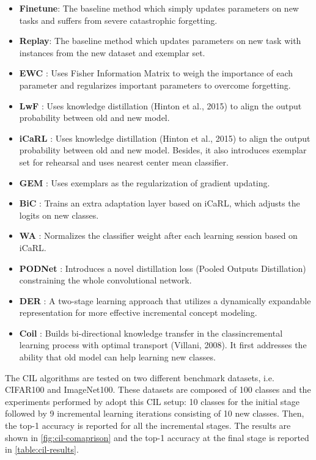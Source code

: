 \begin{itemize}
    \item \textbf{Finetune}: The baseline method which simply updates parameters on new tasks and
    suffers from severe catastrophic forgetting.
    \item \textbf{Replay}: The baseline method which updates parameters on new task with instances
    from the new dataset and exemplar set.
    \item \textbf{EWC} \cite{kirkpatrick2017overcoming}: Uses Fisher Information Matrix to weigh the
    importance of each parameter and regularizes important parameters to overcome forgetting.
    \item \textbf{LwF} \cite{li2017learning}: Uses knowledge distillation (Hinton et al., 2015) to
    align the output probability between old and new model.
    \item \textbf{iCaRL} \cite{rebuffi2017icarl}: Uses knowledge distillation (Hinton et al., 2015) to
    align the output probability between old and new model. Besides, it also introduces
    exemplar set for rehearsal and uses nearest center mean classifier.
    \item \textbf{GEM} \cite{lopez2017gradient}: Uses exemplars as the regularization of
    gradient updating.
    \item \textbf{BiC} \cite{wu2019large}: Trains an extra adaptation layer based on iCaRL, which
    adjusts the logits on new classes.
    \item \textbf{WA} \cite{zhao2020maintaining}: Normalizes the classifier weight after each learning session
    based on iCaRL.
    \item \textbf{PODNet} \cite{douillard2020podnet}: Introduces a novel distillation loss (Pooled
    Outputs Distillation) constraining the whole convolutional network.
    \item \textbf{DER} \cite{yan2021dynamically}: A two-stage learning approach that utilizes a dynamically
    expandable representation for more effective incremental concept modeling.
    \item \textbf{Coil} \cite{zhou2021co}: Builds bi-directional knowledge transfer in the classincremental learning process with optimal transport (Villani, 2008). It first addresses
    the ability that old model can help learning new classes.
\end{itemize}

The CIL algorithms are tested on two different benchmark datasets, i.e. CIFAR100 and ImageNet100. These datasets are composed of 100 classes and the experiments performed by \cite{zhou2021pycil} adopt this CIL setup: 10 classes for the initial stage followed by 9 incremental learning iterations consisting of 10 new classes. Then, the top-1 accuracy is reported for all the incremental stages.
The results are shown in \autoref{fig:cil-comaprison} and the top-1 accuracy at the final stage is reported in \autoref{table:cil-results}.



